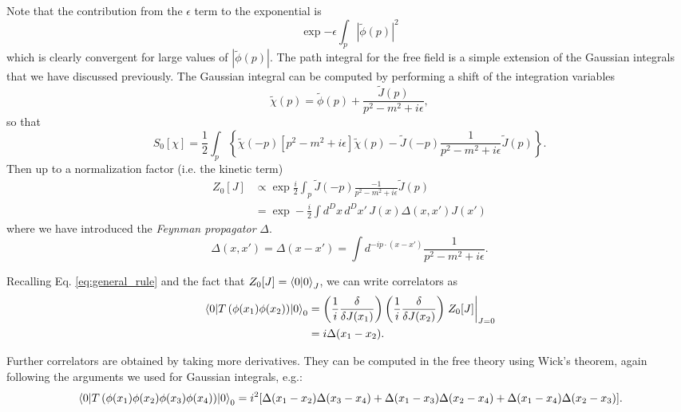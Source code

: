 \documentclass{article}
\numberwithin{equation}{section}
\begin{document}
Note that the contribution from the $\epsilon$ term to the exponential is 
\begin{equation}
    \exp{-\epsilon \int_p \left|\tilde{\phi}(p)\right|^2}
\end{equation}
which is clearly convergent for large values of $|\tilde{\phi}(p)|$. The path integral for the free field is a simple extension of the Gaussian integrals that we have discussed previously. %
The Gaussian integral can be computed by performing a shift of the integration variables
\begin{equation}
    \tilde{\chi}(p) = \tilde{\phi}(p) + \frac{\tilde{J}(p)}{p^2-m^2+i\epsilon},
\end{equation}
so that 
\begin{equation}
    S_0[\chi] = \frac{1}{2} \int_p \left\{\tilde{\chi}(-p)[p^2 - m^2 + i\epsilon]\tilde{\chi}(p) - \tilde{J}(-p) \frac{1}{p^2 - m^2 + i\epsilon} \tilde{J}(p) \right\}.
\end{equation}
Then up to a normalization factor (i.e. the kinetic term)
\begin{equation} \label{eq:z0}
\begin{aligned}
    Z_0[J] &\propto \exp \frac{i}{2} \int_p \tilde{J}(-p)\frac{-1}{p^2-m^2+i\epsilon}\tilde{J}(p) \\
    &= \exp -\frac{i}{2} \int d^Dx\, d^Dx' \, J(x) \Delta(x, x') J(x') 
\end{aligned}
\end{equation}
where we have introduced the \textit{Feynman propagator} $\Delta$.
\begin{equation}
    \Delta(x, x') = \Delta(x - x') = \int d^{-ip\cdot(x-x')} \frac{1}{p^2-m^2+i\epsilon}.
\end{equation}

Recalling Eq. \ref{eq:general_rule} and the fact that $Z_0[J] = \braket{0}{0}_J$, we can write correlators as 
\begin{equation}
\begin{aligned}
    \mel{0}{T\left(\phi(x_1) \phi(x_2)\right)}{0}_0 &= \left(\frac{1}{i}\fdv{J(x_1)}\right)\left(\frac{1}{i}\fdv{J(x_2)}\right) \eval{Z_0[J]}_{J=0} \\
    &= i\Delta(x_1 - x_2).
\end{aligned}
\end{equation}

Further correlators are obtained by taking more derivatives. They can be computed in the free theory using Wick's theorem, again following the arguments we used for Gaussian integrals, e.g.:
\begin{equation}
    \mel{0}{T\left(\phi(x_1)\phi(x_2)\phi(x_3)\phi(x_4)\right)}{0}_0 = i^2[\Delta(x_1-x_2) \Delta(x_3-x_4) + \Delta(x_1-x_3)\Delta(x_2-x_4) + \Delta(x_1-x_4)\Delta(x_2-x_3)].
\end{equation}
\end{document}
